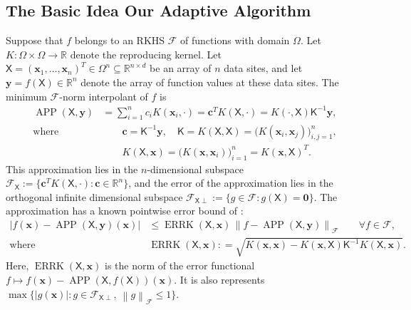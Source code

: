\documentclass[]{mcom-l}
\theoremstyle{theorem}
\theoremstyle{remark}
\DeclareMathOperator{\errK}{ERRK}
\DeclareMathOperator{\APP}{APP}
\newcommand{\reals}{{\mathbb{R}}}
\newcommand{\mK}{\mathsf{K}}
\newcommand{\mX}{\mathsf{X}}
\newcommand{\bzero}{\boldsymbol{0}}
\newcommand{\bc}{{\boldsymbol{c}}}
\newcommand{\bx}{{\boldsymbol{x}}}
\newcommand{\by}{{\boldsymbol{y}}}
\newcommand{\cx}{{\Omega}}
\newcommand{\calf}{{\mathcal{F}}}
\def\abs#1{\ensuremath{\left \lvert #1 \right \rvert}}
\newcommand{\norm}[2][{}]{\ensuremath{\left \lVert #2 \right \rVert}_{#1}}
\newcommand{\bignorm}[2][{}]{\ensuremath{\bigl \lVert #2 \bigr \rVert}_{#1}}
\begin{document}
\subsection{The Basic Idea Our Adaptive Algorithm} \label{sec:basicIdea}
Suppose that $f$ belongs to an RKHS $\calf$ of functions with domain $\cx$.  Let $K: \Omega \times \Omega \to \reals$ denote the reproducing kernel.  Let $\mX = (\bx_1, \ldots, \bx_n)^T \in \cx^n \subseteq \reals^{n \times d}$ be an array of $n$ data sites, and let $\by  = f(\mX) \in \reals^n$ denote the array of function values at these data sites.  
The minimum $\calf$-norm interpolant of $f$ is 
\begin{subequations} \label{eq:RKHSAPP}
\begin{align} 
\APP(\mX,\by) &= \sum_{i=1}^n c_i K(\bx_i,\cdot) = \bc^T K(\mX,\cdot) =  K(\cdot, \mX) \mK^{-1} \by, \\
 \text{where } & \qquad \bc = \mK^{-1} \by, \quad \mK = K(\mX,\mX) = \bigl( K(\bx_i,\bx_j) \bigr)_{i,j=1}^n,  \\
& \qquad  K(\mX,\bx) = \bigl(K(\bx,\bx_i) \bigr)_{i=1}^n =  K(\bx, \mX)^T.
\end{align}
\end{subequations}
This approximation lies in the $n$-dimensional subspace $\calf_{\mX} := \{\bc^T K(\mX,\cdot) : \bc \in \reals^n \}$, and the error of the approximation lies in the orthogonal infinite dimensional subspace $\calf_{\mX \perp} := \{g \in \calf : g(\mX) = \bzero\}$.
The approximation has a known pointwise error bound of \cite{bibid}:
\begin{subequations} \label{eq:RKHSErrBd}
\begin{align}
\abs{f(\bx) - \APP(\mX,\by)(\bx)} & \le  \errK(\mX,\bx) \, \bignorm[\calf]{f - \APP(\mX,\by)}  \qquad \forall f \in \calf,  \\
\text{where} & \errK(\mX,\bx) : = \sqrt{K(\bx,\bx) - K(\bx,\mX) \mK^{-1} K(\mX,\bx)}.
\end{align}
\end{subequations}
Here, $\errK(\mX,\bx)$ is the norm of the error functional $f \mapsto f(\bx)-\APP(\mX,f(\mX))(\bx)$.  It is also represents $\max \{\abs{g(\bx)} : g \in \calf_{\mX \perp}, \ \norm[\calf]{g} \le 1\}$.
\end{document}
